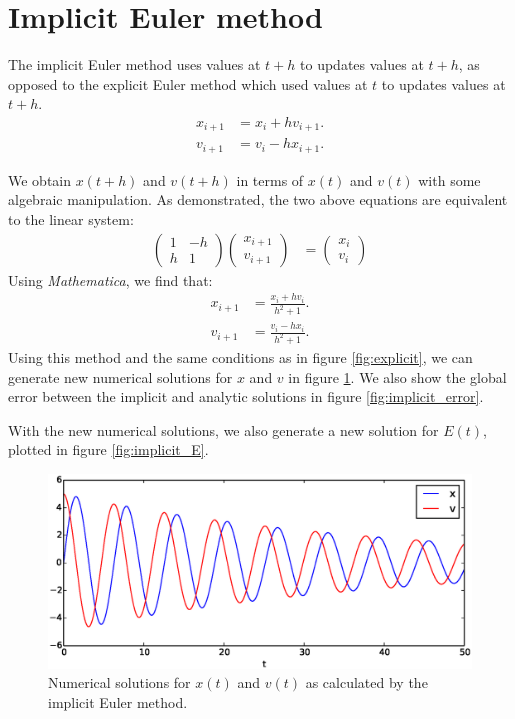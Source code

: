 \documentclass{article}
\theoremstyle{definition}
\renewcommand{\>}{\rangle}
\newcommand{\<}{\langle}
\begin{document}
\section{Implicit Euler method}

The implicit Euler method uses values at $t+h$ to updates values at $t+h$, as
opposed to the explicit Euler method which used values at $t$ to updates values
at $t+h$.
\begin{align*}
x_{i+1} &= x_i + hv_{i+1}. \\
v_{i+1} &= v_i - hx_{i+1}.
\end{align*}

We obtain $x(t+h)$ and $v(t+h)$ in terms of $x(t)$ and $v(t)$ with some algebraic
manipulation. As demonstrated, the two above equations are equivalent to the
linear system:
\begin{align*}
\left(\begin{array}{cc}
1 & -h \\
h & 1
\end{array}\right)
\left(\begin{array}{c}
x_{i+1} \\
v_{i+1}
\end{array}\right)
&=
\left(\begin{array}{c}
x_i \\
v_i
\end{array}\right)
\end{align*}
Using \emph{Mathematica}, we find that:
\begin{align*}
x_{i+1} &= \frac{x_i + hv_i}{h^2 + 1}. \\
v_{i+1} &= \frac{v_i - hx_i}{h^2 + 1}.
\end{align*}
Using this method and the same conditions as in figure \ref{fig:explicit}, we can
generate new numerical solutions for $x$ and $v$ in figure \ref{fig:implicit}.
We also show the global error between the implicit and analytic solutions
in figure \ref{fig:implicit_error}.

With the new numerical solutions, we also generate a new solution for
$E(t)$, plotted in figure \ref{fig:implicit_E}. 

\begin{figure}
\includegraphics[width=\textwidth]{implicit.eps}
\caption{\label{fig:implicit}Numerical solutions for $x(t)$ and $v(t)$ as calculated by
the implicit Euler method.}
\end{figure}
\end{document}
